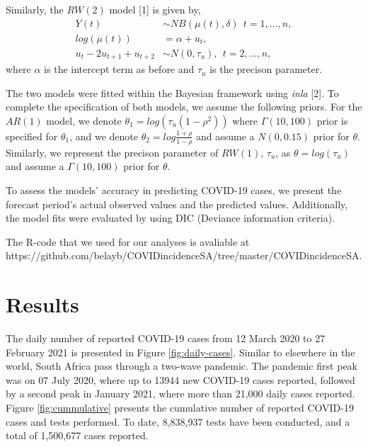 \documentclass[10pt,letterpaper]{article}
\begin{document}
Similarly, the \(RW(2)\) model {[}1{]} is given by, \[
\begin{aligned}
 Y(t) &\sim NB(\mu(t), \delta) \ \ t=1, \dots, n,\\
 log(\mu(t)) &= \alpha+u_t, \\
 u_t-2u_{t+1}+u_{t+2} &\sim N(0, \tau_u), \ \ t=2, \dots, n,
\end{aligned}
\] where \(\alpha\) is the intercept term as before and \(\tau_u\) is
the precison parameter.

The two models were fitted within the Bayesian framework using
\emph{inla} {[}2{]}. To complete the specification of both models, we
assume the following priors. For the \(AR(1)\) model, we denote
\(\theta_1=log(\tau_u(1-\rho^2))\) where \(\Gamma(10,100)\) prior is
specified for \(\theta_1\), and we denote
\(\theta_2=log\frac{1+\rho}{1-\rho}\) and assume a \(N(0, 0.15)\) prior
for \(\theta\). Similarly, we represent the precison parameter of
\(RW(1)\), \(\tau_u\), as \(\theta=log(\tau_u)\) and assume a
\(\Gamma (10,100)\) prior for \(\theta\).

To assess the models' accuracy in predicting COVID-19 cases, we present
the forecast period's actual observed values and the predicted values.
Additionally, the model fits were evaluated by using DIC (Deviance
information criteria).

The R-code that we used for our analyses is avaliable at
https://github.com/belayb/COVIDincidenceSA/tree/master/COVIDincidenceSA.

\hypertarget{results}{%
\section{Results}\label{results}}

The daily number of reported COVID-19 cases from 12
March 2020 to 27 February 2021 is presented in Figure \ref{fig:daily-cases}. Similar to elsewhere in the world, South
Africa pass through a two-wave pandemic. The pandemic first peak was
on 07 July 2020, where up to 13944 new COVID-19 cases reported, followed
by a second peak in January 2021, where more than 21,000 daily cases
reported. Figure \ref{fig:cummulative} presents the cumulative number of reported
COVID-19 cases and tests performed. To date, 8,838,937 tests have been
conducted, and a total of 1,500,677 cases reported.
\end{document}
